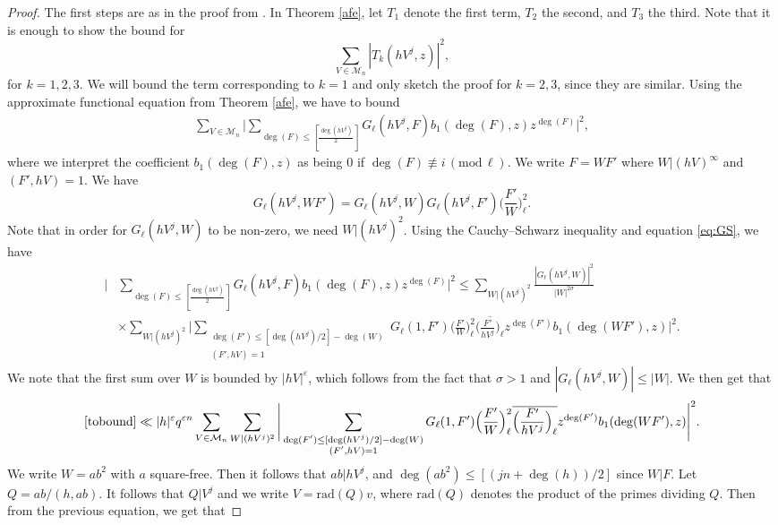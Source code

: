 \documentclass[12pt]{amsart}
\renewcommand{\pmod}[1]{\,(\mathrm{mod}\,#1)}
\begin{document}
\begin{proof} The first steps are as in the proof from \cite[Lemma 6.5]{ddds}.
In Theorem \ref{afe}, let $T_1$ denote the first term, $T_2$ the second, and $T_3$ the third. Note that it is enough to show the bound for
$$\sum_{V \in \mathcal{M}_n} |T_k(hV^j,z)|^2,$$
for $k=1,2,3$. We will bound the term corresponding to $k=1$ and only sketch the proof for $k=2,3$, since they are similar. Using the approximate functional equation from Theorem \ref{afe}, we have to bound
\begin{align}
\label{tobound}
 \sum_{V \in \mathcal{M}_n} \Bigg| \sum_{\deg(F) \leq [\frac{\deg(hV^j)}{2}]} G_{\ell}(hV^j,F)b_1(\deg(F),z) z^{\deg(F)} \Bigg|^2,
 \end{align} where we interpret the coefficient $b_1(\deg(F),z)$ as being $0$ if $\deg(F) \not \equiv i \pmod \ell$. We write $F=W F'$ where $W|(hV)^{\infty}$ and $(F', hV)=1$. We have
$$ G_{\ell} (hV^j, WF') = G_{\ell} (hV^j,W) G_{\ell} (hV^j,F') \Big( \frac{F'}{W} \Big)_{\ell}^2.$$
Note that in order for $G_{\ell}(hV^j,W)$ to be non-zero, we need $W|(hV^j)^{2}$. Using the Cauchy--Schwarz inequality and equation \eqref{eq:GS}, we have
\begin{align}
\Bigg|& \sum_{\deg(F)  \leq [\frac{\deg(hV^j)}{2}]} G_{\ell}(hV^j,F)b_1(\deg(F),z) z^{\deg(F)} \Bigg|^2 \leq \sum_{W|(hV^j)^2} \frac{|G_{\ell}(hV^j,W)|^2}{|W|^{2\sigma}} \label{sumw} \\
& \times  \sum_{W|(hV^j)^2} \Bigg| \sum_{\substack{\deg(F') \leq [\deg(hV^j)/2]-\deg(W) \\ (F', hV)=1}} G_{\ell}(1,F') \Big(  \frac{F'}{W}\Big)_{\ell}^2 \overline{\Big( \frac{F'}{hV^j}\Big)_{\ell} } z^{\deg(F')} b_1(\deg(WF'),z) \Bigg|^2. \nonumber
\end{align}
We note that the first sum over $W$ is bounded by $|hV|^{\varepsilon}$, which follows from the fact that $\sigma > 1$ and $|G_{\ell}(hV^j, W)| \leq |W|$. We then get that
\begin{align*}
\eqref{tobound} \ll |h|^{\varepsilon} q^{\varepsilon n} \sum_{V \in \mathcal{M}_n}  \sum_{W|(hV^j)^2} \Bigg| \sum_{\substack{\deg(F') \leq [\deg(hV^j)/2]-\deg(W) \\ (F', hV)=1}} G_{\ell}(1,F') \Big(  \frac{F'}{W}\Big)_{\ell}^2 \overline{\Big( \frac{F'}{hV^j}\Big)_{\ell} } z^{\deg(F')} b_1(\deg(WF'),z) \Bigg|^2.
\end{align*}
 We write $W=ab^2$ with $a$ square-free. Then it follows that $ab|hV^j$, and $\deg(ab^2) \leq [(jn+\deg(h))/2]$ since $W | F$.
 Let $Q=ab/(h,ab)$. It follows that $Q|V^{j}$ and we write $V=\text{rad}(Q)v$, where $\text{rad}(Q)$ denotes the product of the primes dividing $Q$. Then from the previous equation, we get that

\end{proof}
\end{document}
